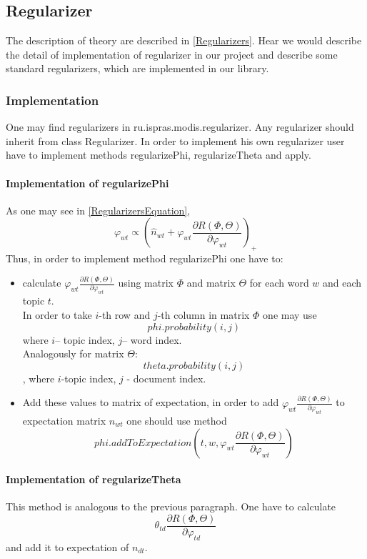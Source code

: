 \subsection{Regularizer}
    The description of theory are described in \ref{Regularizers}. Hear we would describe the detail of implementation of regularizer in our project and describe some standard regularizers,
    which are implemented in our library.
    \subsubsection{Implementation}
	One may find regularizers in ru.ispras.modis.regularizer. Any regularizer should inherit from class Regularizer. In order to implement his own regularizer user have to implement methods
	regularizePhi, regularizeTheta and apply.
	\paragraph{Implementation of regularizePhi\\}
	As one may see in \ref{RegularizersEquation},
	\begin{equation} \varphi_{wt} \propto \left(\hat{n}_{wt} + \varphi_{wt} \frac{\partial  R(\Phi, \Theta)}{\partial \varphi_{wt}} \right)_+ \end{equation}
	Thus, in order to implement method regularizePhi one have to:
	\begin{itemize}
	    \item calculate $\varphi_{wt} \frac{\partial  R(\Phi, \Theta)}{\partial \varphi_{wt}}$ using matrix $\Phi$ and matrix $\Theta$ for each word $w$ and
		each topic $t$.\\
		In order to take $i$\--th row and $j$\--th column in matrix $\Phi$ one may use $$phi.probability(i, j)$$ where $i$\--- topic index,
		$j$\--- word index.\\
		Analogously for matrix $\Theta$: $$theta.probability(i, j)$$, where $i$\--topic index, $j$ \-- document index.
	    \item Add these values to matrix of expectation, in order to add $\varphi_{wt} \frac{\partial  R(\Phi, \Theta)}{\partial \varphi_{wt}}$ to
		expectation matrix $n_{wt}$ one should use method\\
		$$phi.addToExpectation(t, w, \varphi_{wt} \frac{\partial  R(\Phi, \Theta)}{\partial \varphi_{wt}})$$
	\end{itemize}
	
    \paragraph{Implementation of regularizeTheta \\}
	This method is analogous to the previous paragraph. One have to calculate $$ \theta_{td}\frac{\partial  R(\Phi, \Theta)}{\partial \varphi_{td}} $$
	and add it to expectation of $n_{dt}$.
